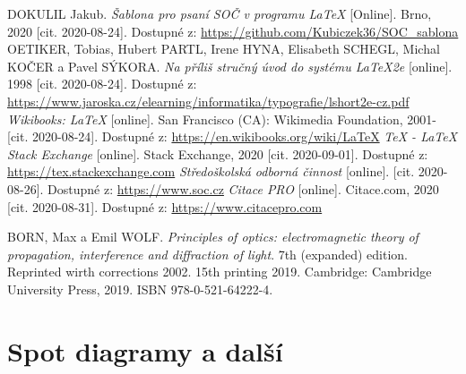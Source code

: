 \documentclass[12pt, a4paper,
 twoside,        %
 openright
]{report}
\begin{document}
\begin{thebibliography}{99}
     DOKULIL Jakub. \textit{Šablona pro psaní SOČ v programu \LaTeX} [Online]. Brno, 2020 [cit. 2020-08-24]. Dostupné z: \url{https://github.com/Kubiczek36/SOC_sablona}
    OETIKER, Tobias, Hubert PARTL, Irene HYNA, Elisabeth SCHEGL, Michal KOČER a Pavel SÝKORA. \textit{Na příliš stručný úvod do systému LaTeX2e} [online]. 1998 [cit. 2020-08-24]. Dostupné z: \url{https://www.jaroska.cz/elearning/informatika/typografie/lshort2e-cz.pdf}
    \textit{Wikibooks: LaTeX} [online]. San Francisco (CA): Wikimedia Foundation, 2001- [cit. 2020-08-24]. Dostupné z: \url{https://en.wikibooks.org/wiki/LaTeX}
     \textit{TeX - LaTeX Stack Exchange} [online]. Stack Exchange, 2020 [cit. 2020-09-01]. Dostupné z: \url{https://tex.stackexchange.com}
     \textit{Středoškolská odborná činnost} [online]. [cit. 2020-08-26]. Dostupné z: \url{https://www.soc.cz}
    \textit{Citace PRO} [online]. Citace.com, 2020 [cit. 2020-08-31]. Dostupné z: \url{https://www.citacepro.com}

     BORN, Max a Emil WOLF. \textit{Principles of optics: electromagnetic theory of propagation, interference and diffraction of light}. 7th (expanded) edition. Reprinted wirth corrections 2002. 15th printing 2019. Cambridge: Cambridge University Press, 2019. ISBN 978-0-521-64222-4.
\end{thebibliography}

\listoffigures

\listoftables

\appendix %

[\vspace{-22pt}] %


\chapter{%
Spot diagramy a další }


\end{document}
